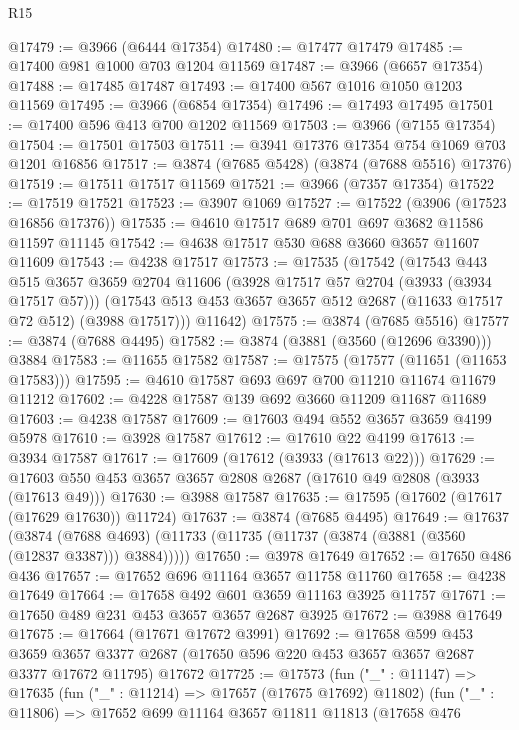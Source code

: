 \begin{lexlean}{R15}
\begin{coremodule}
@17479 := @3966 (@6444 @17354)
@17480 := @17477 @17479
@17485 := @17400 @981 @1000 @703 @1204 @11569
@17487 := @3966 (@6657 @17354)
@17488 := @17485 @17487
@17493 := @17400 @567 @1016 @1050 @1203 @11569
@17495 := @3966 (@6854 @17354)
@17496 := @17493 @17495
@17501 := @17400 @596 @413 @700 @1202 @11569
@17503 := @3966 (@7155 @17354)
@17504 := @17501 @17503
@17511 := @3941 @17376 @17354 @754 @1069 @703 @1201 @16856
@17517 := @3874 (@7685 @5428) (@3874 (@7688 @5516) @17376)
@17519 := @17511 @17517 @11569
@17521 := @3966 (@7357 @17354)
@17522 := @17519 @17521
@17523 := @3907 @1069
@17527 := @17522 (@3906 (@17523 @16856 @17376))
@17535 := @4610 @17517 @689 @701 @697 @3682 @11586 @11597 @11145
@17542 := @4638 @17517 @530 @688 @3660 @3657 @11607 @11609
@17543 := @4238 @17517
@17573 := @17535
    (@17542
      (@17543
        @443
        @515
        @3657
        @3659
        @2704
        @11606
        (@3928 @17517 @57 @2704 (@3933 (@3934 @17517 @57)))
        (@17543 @513 @453 @3657 @3657 @512 @2687 (@11633 @17517 @72 @512) (@3988 @17517)))
      @11642)
@17575 := @3874 (@7685 @5516)
@17577 := @3874 (@7688 @4495)
@17582 := @3874 (@3881 (@3560 (@12696 @3390))) @3884
@17583 := @11655 @17582
@17587 := @17575 (@17577 (@11651 (@11653 @17583)))
@17595 := @4610 @17587 @693 @697 @700 @11210 @11674 @11679 @11212
@17602 := @4228 @17587 @139 @692 @3660 @11209 @11687 @11689
@17603 := @4238 @17587
@17609 := @17603 @494 @552 @3657 @3659 @4199 @5978
@17610 := @3928 @17587
@17612 := @17610 @22 @4199
@17613 := @3934 @17587
@17617 := @17609 (@17612 (@3933 (@17613 @22)))
@17629 := @17603 @550 @453 @3657 @3657 @2808 @2687 (@17610 @49 @2808 (@3933 (@17613 @49)))
@17630 := @3988 @17587
@17635 := @17595 (@17602 (@17617 (@17629 @17630)) @11724)
@17637 := @3874 (@7685 @4495)
@17649 := @17637
    (@3874 (@7688 @4693) (@11733 (@11735 (@11737 (@3874 (@3881 (@3560 (@12837 @3387))) @3884)))))
@17650 := @3978 @17649
@17652 := @17650 @486 @436
@17657 := @17652 @696 @11164 @3657 @11758 @11760
@17658 := @4238 @17649
@17664 := @17658 @492 @601 @3659 @11163 @3925 @11757
@17671 := @17650 @489 @231 @453 @3657 @3657 @2687 @3925
@17672 := @3988 @17649
@17675 := @17664 (@17671 @17672 @3991)
@17692 := @17658
    @599
    @453
    @3659
    @3657
    @3377
    @2687
    (@17650 @596 @220 @453 @3657 @3657 @2687 @3377 @17672 @11795)
    @17672
@17725 := @17573
    (fun ("_" : @11147) =>
    @17635
      (fun ("_" : @11214) => @17657 (@17675 @17692) @11802)
      (fun ("_" : @11806) =>
      @17652
        @699
        @11164
        @3657
        @11811
        @11813
        (@17658
          @476

\end{coremodule}
\end{lexlean}
